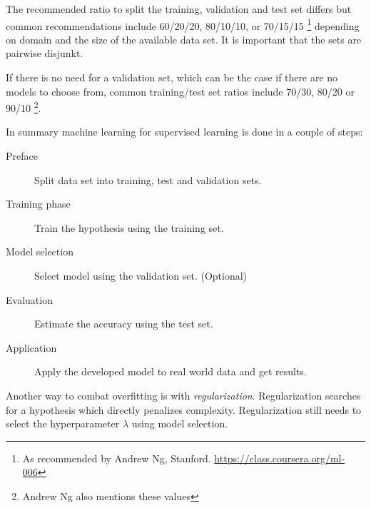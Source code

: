 The recommended ratio to split the training, validation and test set differs but common recommendations include 60/20/20, 80/10/10, or 70/15/15 \footnote{As recommended by Andrew Ng, Stanford. \url{https://class.coursera.org/ml-006}} depending on domain and the size of the available data set. It is important that the sets are pairwise disjunkt.

If there is no need for a validation set, which can be the case if there are no models to choose from, common training/test set ratios include 70/30, 80/20 or 90/10 \cite{hu2008collaborative, norvigAI} \footnote{Andrew Ng also mentions these values}.

In summary machine learning for supervised learning is done in a couple of steps:

\begin{description}
    \item[Preface] Split data set into training, test and validation sets.
    \item[Training phase] Train the hypothesis using the training set.
    \item[Model selection] Select model using the validation set. (Optional)
    \item[Evaluation] Estimate the accuracy using the test set.
    \item[Application] Apply the developed model to real world data and get results.
\end{description}

Another way to combat overfitting is with \textit{regularization}. Regularization searches for a hypothesis which directly penalizes complexity.  Regularization still needs to select the hyperparameter $\lambda$ using model selection.
\citep{norvigAI}
